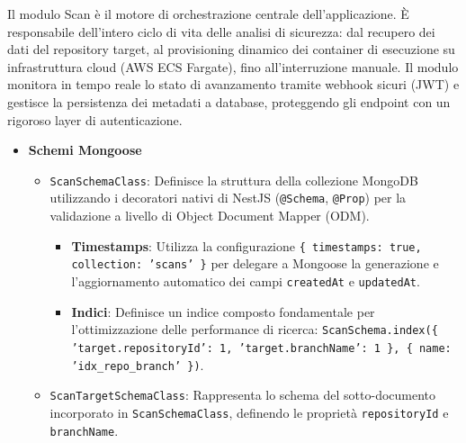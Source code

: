 \documentclass[a4paper, 11pt]{article}
\newcounter{subsubsubsection}[subsubsection]
\newcounter{subsubsubsubsection}[subsubsubsection]
\begin{document}
Il modulo Scan è il motore di orchestrazione centrale dell'applicazione. È responsabile dell'intero ciclo di vita delle analisi di sicurezza: dal recupero dei dati del repository target, al provisioning dinamico dei container di esecuzione su infrastruttura cloud (AWS ECS Fargate), fino all'interruzione manuale. Il modulo monitora in tempo reale lo stato di avanzamento tramite webhook sicuri (JWT) e gestisce la persistenza dei metadati a database, proteggendo gli endpoint con un rigoroso layer di autenticazione.


\begin{itemize}
  \item \textbf{Schemi Mongoose}
      \begin{itemize}
          \item \texttt{ScanSchemaClass}: Definisce la struttura della collezione MongoDB utilizzando i decoratori nativi di NestJS (\texttt{@Schema}, \texttt{@Prop}) per la validazione a livello di Object Document Mapper (ODM).
          \begin{itemize}
                \item \textbf{Timestamps}: Utilizza la configurazione \texttt{\{ timestamps: true, collection: 'scans' \}} per delegare a Mongoose la generazione e l'aggiornamento automatico dei campi \texttt{createdAt} e \texttt{updatedAt}.
                \item \textbf{Indici}: Definisce un indice composto fondamentale per l'ottimizzazione delle performance di ricerca: \texttt{ScanSchema.index(\{ 'target.repositoryId': 1, 'target.branchName': 1 \}, \{ name: 'idx\_repo\_branch' \})}.
            \end{itemize}
      \item \texttt{ScanTargetSchemaClass}: Rappresenta lo schema del sotto-documento incorporato in \texttt{ScanSchemaClass}, definendo le proprietà \texttt{repositoryId} e \texttt{branchName}.
      \end{itemize}
\end{itemize}

\end{document}
